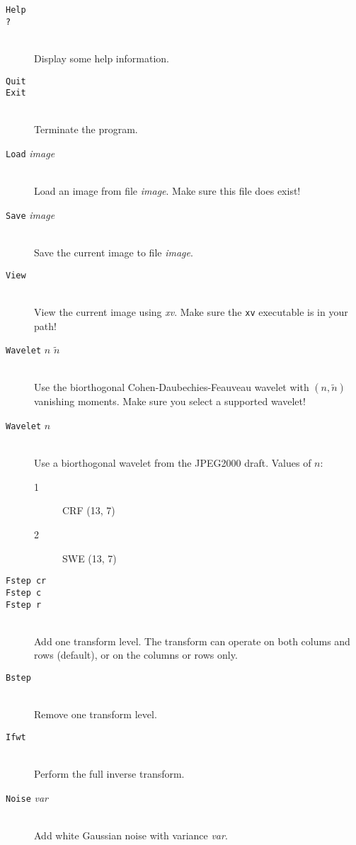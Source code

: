 \begin{description}
\item[\texttt{Help}]
\item[\texttt{?}]\mbox{}\\
    Display some help information.
\item[\texttt{Quit}]
\item[\texttt{Exit}]\mbox{}\\
    Terminate the program.
\item[\texttt{Load} \emph{image}]\mbox{}\\
    Load an image from file \emph{image}. Make sure this file does exist!
\item[\texttt{Save} \emph{image}]\mbox{}\\
    Save the current image to file \emph{image}.
\item[\texttt{View}]\mbox{}\\
    View the current image using \emph{xv}. Make sure the \texttt{xv}
    executable is in your path!
\item[\texttt{Wavelet} $n$ $\widetilde{n}$]\mbox{}\\
    Use the biorthogonal Cohen-Daubechies-Feauveau wavelet with $(n,
    \widetilde{n})$ vanishing moments. Make sure you select a supported
    wavelet!
\item[\texttt{Wavelet} $n$]\mbox{}\\
    Use a biorthogonal wavelet from the JPEG2000 draft. Values of $n$:
    \begin{description}
	\item[1] CRF (13, 7)
	\item[2] SWE (13, 7)
    \end{description}
\item[\texttt{Fstep cr}]
\item[\texttt{Fstep c}]
\item[\texttt{Fstep r}]\mbox{}\\
    Add one transform level. The transform can operate on both colums and rows
    (default), or on the columns or rows only.
\item[\texttt{Bstep}]\mbox{}\\
    Remove one transform level.
\item[\texttt{Ifwt}]\mbox{}\\
    Perform the full inverse transform.
\item[\texttt{Noise} \emph{var}]\mbox{}\\
    Add white Gaussian noise with variance \emph{var}.

\end{description}

